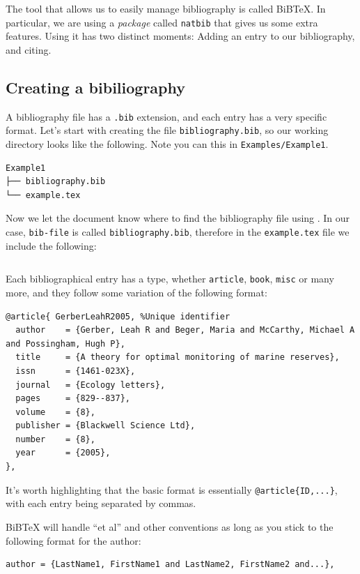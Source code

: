 The tool that allows us to easily manage bibliography is called BiBTeX. In particular, we are using a \emph{package} called \verb|natbib| that gives us some extra features.
Using it has two distinct moments: Adding an entry to our bibliography, and citing.

\subsection{Creating a bibiliography}
A bibliography file has a \verb|.bib| extension, and each entry has a very specific format.
Let's start with creating the file \verb|bibliography.bib|, so our working directory looks like the following.
Note you can this in \texttt{Examples/Example1}.
\begin{verbatim}
Example1
├── bibliography.bib
└── example.tex
\end{verbatim}

Now we let the document know where to find the bibliography file using \verb||.
In our case, \texttt{bib-file} is called \verb|bibliography.bib|, therefore in the \texttt{example.tex} file we include the following:
\begin{lstlisting}

\end{lstlisting}

Each bibliographical entry has a type, whether \verb|article|, \verb|book|, \verb|misc| or many more, and they follow some variation of the following format:
\begin{lstlisting}
@article{ GerberLeahR2005, %Unique identifier
  author    = {Gerber, Leah R and Beger, Maria and McCarthy, Michael A and Possingham, Hugh P},
  title     = {A theory for optimal monitoring of marine reserves},
  issn      = {1461-023X},
  journal   = {Ecology letters},
  pages     = {829--837},
  volume    = {8},
  publisher = {Blackwell Science Ltd},
  number    = {8},
  year      = {2005},
},
\end{lstlisting}

It's worth highlighting that the basic format is essentially \verb|@article{ID,...}|, with each entry being separated by commas.

BiBTeX will handle ``et al'' and other conventions as long as you stick to the following format for the author:
\begin{lstlisting}
author = {LastName1, FirstName1 and LastName2, FirstName2 and...},
\end{lstlisting}

